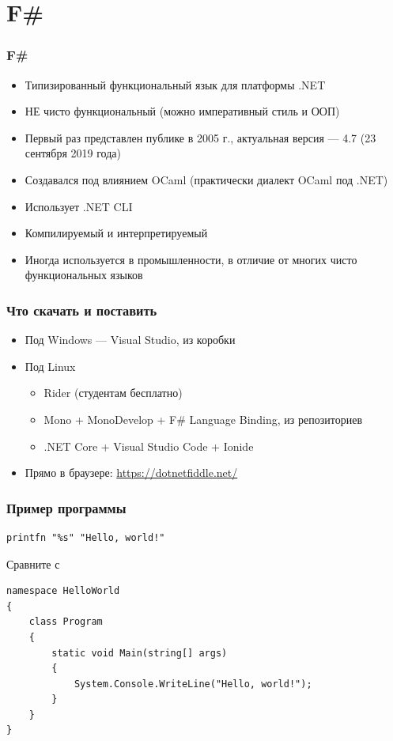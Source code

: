 \documentclass[xetex,mathserif,serif]{beamer}
\begin{document}
	\section{F\#}

	\begin{frame}
		\frametitle{F\#}
		\begin{itemize}
			\item Типизированный функциональный язык для платформы .NET
			\item НЕ чисто функциональный (можно императивный стиль и ООП)
			\item Первый раз представлен публике в 2005 г., актуальная версия --- 4.7 (23 сентября 2019 года)
			\item Создавался под влиянием OCaml (практически диалект OCaml под .NET)
			\item Использует .NET CLI
			\item Компилируемый и интерпретируемый
			\item Иногда используется в промышленности, в отличие от многих чисто функциональных языков
		\end{itemize}
	\end{frame}

	\begin{frame}
		\frametitle{Что скачать и поставить}
		\begin{itemize}
			\item Под Windows --- Visual Studio, из коробки
			\item Под Linux
			\begin{itemize}
				\item Rider (студентам бесплатно)
				\item Mono + MonoDevelop + F\# Language Binding, из репозиториев
				\item .NET Core + Visual Studio Code + Ionide
			\end{itemize}
			\item Прямо в браузере: \url{https://dotnetfiddle.net/}
		\end{itemize}
	\end{frame}
	
	\begin{frame}[fragile]
		\frametitle{Пример программы}
		\begin{verbatim}
printfn "%s" "Hello, world!"
		\end{verbatim}
		Сравните с
		\begin{verbatim}
namespace HelloWorld
{
    class Program
    {
        static void Main(string[] args)
        {
            System.Console.WriteLine("Hello, world!");
        }
    }
}
		\end{verbatim}
	\end{frame}
\end{document}

